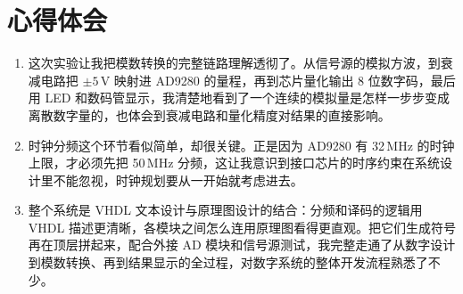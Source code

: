 \documentclass[12pt]{ctexart}
\begin{document}
\section{心得体会}

\begin{enumerate}
    \item 这次实验让我把模数转换的完整链路理解透彻了。从信号源的模拟方波，到衰减电路把 $\pm5\,$V 映射进 AD9280 的量程，再到芯片量化输出 8 位数字码，最后用 LED 和数码管显示，我清楚地看到了一个连续的模拟量是怎样一步步变成离散数字量的，也体会到衰减电路和量化精度对结果的直接影响。
    \item 时钟分频这个环节看似简单，却很关键。正是因为 AD9280 有 32\,MHz 的时钟上限，才必须先把 50\,MHz 分频，这让我意识到接口芯片的时序约束在系统设计里不能忽视，时钟规划要从一开始就考虑进去。
    \item 整个系统是 VHDL 文本设计与原理图设计的结合：分频和译码的逻辑用 VHDL 描述更清晰，各模块之间怎么连用原理图看得更直观。把它们生成符号再在顶层拼起来，配合外接 AD 模块和信号源测试，我完整走通了从数字设计到模数转换、再到结果显示的全过程，对数字系统的整体开发流程熟悉了不少。
\end{enumerate}
\end{document}
